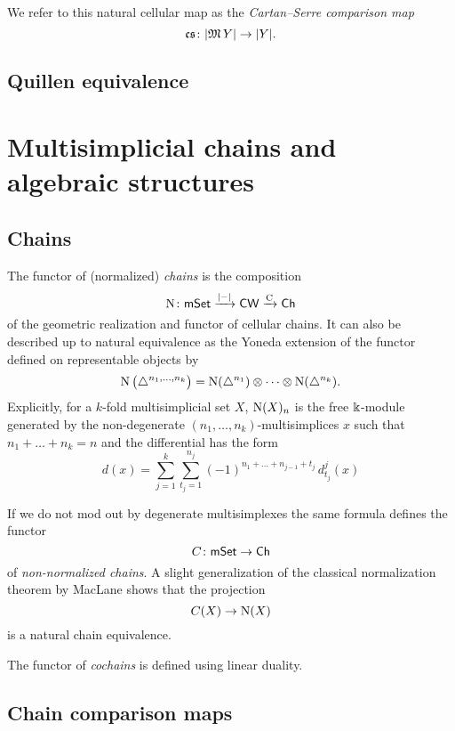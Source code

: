 
We refer to this natural cellular map as the \textit{Cartan--Serre comparison map}
\[
\operatorname{\mathfrak{cs}} \colon \lvert\operatorname{\mathfrak{M}} Y\rvert \to \lvert Y\rvert.
\]

\subsection{Quillen equivalence}


\section{Multisimplicial chains and algebraic structures}

\subsection{Chains}

The functor of (normalized) \textit{chains} is the composition
\[
\operatorname{N} \colon \mathsf{mSet} \xrightarrow{\lvert-\rvert} \mathsf{CW} \xrightarrow{\operatorname{C}} \mathsf{Ch}
\]
of the geometric realization and functor of cellular chains.
It can also be described up to natural equivalence as the Yoneda extension of the functor defined on representable objects by
\[
\operatorname{N} \big( \triangle^{n_1, \dots, n_k} \big) =
\operatorname{N}(\triangle^{n_1}) \otimes \dotsb \otimes \operatorname{N}(\triangle^{n_k}).
\]
Explicitly, for a $k$-fold multisimplicial set $X$, $\operatorname{N}(X)_n$ is the free $\Bbbk$-module generated by the non-degenerate $(n_1, \dots, n_k)$-multisimplices $x$ such that $n_1 + \dots + n_k = n$ and the differential has the form 
\[
d(x) = \sum_{j=1}^k \sum_{t_j=1}^{n_j}
(-1)^{n_{1}+\dots+n_{j-1}+t_j} \, d^j_{t_j}(x)
\]

If we do not mod out by degenerate multisimplexes the same formula defines the functor
\[
C \colon \mathsf{mSet} \to \mathsf{Ch}
\]
of \textit{non-normalized chains}.
A slight generalization of the classical normalization theorem by MacLane \cite{MacLane} shows that the projection
\[
C(X) \to \operatorname{N}(X)
\]
is a natural chain equivalence.

The functor of \textit{cochains} is defined using linear duality.

\subsection{Chain comparison maps} \label{ss:comparison chain maps}

